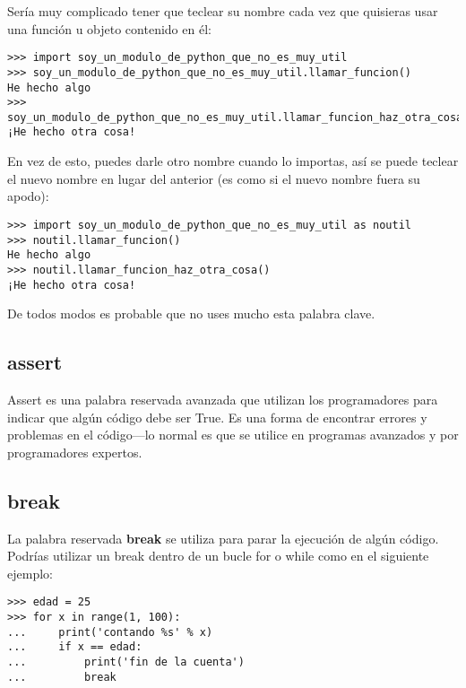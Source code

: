 \noindent
Sería muy complicado tener que teclear su nombre cada vez que quisieras usar una función u objeto contenido en él:

\begin{listingignore}
\begin{verbatim}
>>> import soy_un_modulo_de_python_que_no_es_muy_util
>>> soy_un_modulo_de_python_que_no_es_muy_util.llamar_funcion()
He hecho algo
>>> soy_un_modulo_de_python_que_no_es_muy_util.llamar_funcion_haz_otra_cosa()
¡He hecho otra cosa!
\end{verbatim}
\end{listingignore}

\noindent
En vez de esto, puedes darle otro nombre cuando lo importas, así se puede teclear el nuevo nombre en lugar del anterior (es como si el nuevo nombre fuera su apodo):

\begin{listingignore}
\begin{verbatim}
>>> import soy_un_modulo_de_python_que_no_es_muy_util as noutil
>>> noutil.llamar_funcion()
He hecho algo
>>> noutil.llamar_funcion_haz_otra_cosa()
¡He hecho otra cosa!
\end{verbatim}
\end{listingignore}

\noindent
De todos modos es probable que no uses mucho esta palabra clave.

\subsection*{assert}

Assert es una palabra reservada avanzada que utilizan los programadores para indicar que algún código debe ser True.  Es una forma de encontrar errores y problemas en el código---lo normal es que se utilice en programas avanzados y por programadores expertos.

\subsection*{break}

La palabra reservada \textbf{break} se utiliza para parar la ejecución de algún código. Podrías utilizar un break dentro de un bucle for o while como en el siguiente ejemplo:

\begin{listing}
\begin{verbatim}
>>> edad = 25
>>> for x in range(1, 100):
...     print('contando %s' % x)
...     if x == edad:
...         print('fin de la cuenta')
...         break
\end{verbatim}
\end{listing}

